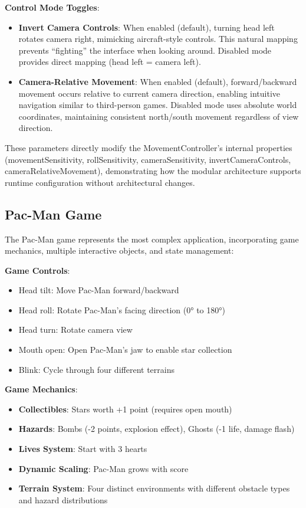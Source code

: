 \documentclass[sigconf]{acmart}
\begin{document}
\textbf{Control Mode Toggles}:
\begin{itemize}
\item \textbf{Invert Camera Controls}: When enabled (default), turning head left rotates camera right, mimicking aircraft-style controls. This natural mapping prevents ``fighting'' the interface when looking around. Disabled mode provides direct mapping (head left = camera left).
\item \textbf{Camera-Relative Movement}: When enabled (default), forward/backward movement occurs relative to current camera direction, enabling intuitive navigation similar to third-person games. Disabled mode uses absolute world coordinates, maintaining consistent north/south movement regardless of view direction.
\end{itemize}

These parameters directly modify the MovementController's internal properties (movementSensitivity, rollSensitivity, cameraSensitivity, invertCameraControls, cameraRelativeMovement), demonstrating how the modular architecture supports runtime configuration without architectural changes.

\subsection{Pac-Man Game}

The Pac-Man game represents the most complex application, incorporating game mechanics, multiple interactive objects, and state management:

\textbf{Game Controls}:
\begin{itemize}
\item Head tilt: Move Pac-Man forward/backward
\item Head roll: Rotate Pac-Man's facing direction (0° to 180°)
\item Head turn: Rotate camera view
\item Mouth open: Open Pac-Man's jaw to enable star collection
\item Blink: Cycle through four different terrains
\end{itemize}

\textbf{Game Mechanics}:
\begin{itemize}
\item \textbf{Collectibles}: Stars worth +1 point (requires open mouth)
\item \textbf{Hazards}: Bombs (-2 points, explosion effect), Ghosts (-1 life, damage flash)
\item \textbf{Lives System}: Start with 3 hearts
\item \textbf{Dynamic Scaling}: Pac-Man grows with score
\item \textbf{Terrain System}: Four distinct environments with different obstacle types and hazard distributions
\end{itemize}
\end{document}
